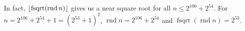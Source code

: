 \documentclass[a4paper]{article}
\DeclarePairedDelimiter\floor{\lfloor}{\rfloor}
\DeclareMathOperator{\rnd}{rnd}
\DeclareMathOperator{\fsqrt}{fsqrt}
\theoremstyle{plain}
\theoremstyle{definition}
\begin{document}
In fact, $\floor{\fsqrt(\rnd n)}$ gives us a near square root for all
$n \le 2^{106} + 2^{54}$. For $n = 2^{106} + 2^{54} + 1 = (2^{53} + 1)^2$,
$\rnd n = 2^{106} + 2^{54}$ and $\fsqrt(\rnd n) = 2^{53}$.


\end{document}
